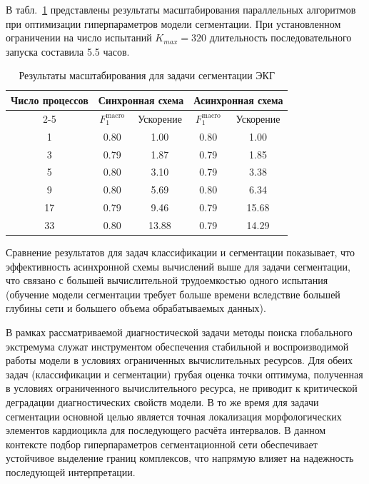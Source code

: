 \documentclass[11pt, oneside, a4paper]{article}
\begin{document}
В табл.~\ref{tab_segmentation_scalability} представлены результаты масштабирования параллельных алгоритмов при оптимизации гиперпараметров модели сегментации. При установленном ограничении на число испытаний $K_{max} = 320$ длительность последовательного запуска составила 5.5 часов.

\begin{table}[ht]
\caption{Результаты масштабирования для задачи сегментации ЭКГ}
\label{tab_segmentation_scalability}
\centering
\begin{tabular}{|c|c|c|c|c|}
\hline
Число процессов & \multicolumn{2}{c|}{Синхронная схема} & \multicolumn{2}{c|}{Асинхронная схема} \\
\cline{2-5}
& $F_1^{\mathrm{macro}}$ & Ускорение & $F_1^{\mathrm{macro}}$ & Ускорение \\
\hline
1  & 0.80  & 1.00   & 0.80  & 1.00  \\
3  & 0.79   & 1.87    & 0.79  & 1.85  \\
5  & 0.80   & 3.10    & 0.79  & 3.38  \\
9  & 0.80  & 5.69   & 0.80  & 6.34  \\
17 & 0.79  & 9.46   & 0.79  & 15.68 \\
33 & 0.80  & 13.88  & 0.79  & 14.29 \\
\hline
\end{tabular}

\end{table}

Сравнение результатов для задач классификации и сегментации показывает, что эффективность асинхронной схемы вычислений выше для задачи сегментации, что связано с большей вычислительной трудоемкостью одного испытания (обучение модели сегментации требует больше времени вследствие большей глубины сети и большего объема обрабатываемых данных).



В рамках рассматриваемой диагностической задачи методы поиска глобального экстремума служат инструментом обеспечения стабильной и воспроизводимой работы модели в условиях ограниченных вычислительных ресурсов.
Для обеих задач (классификации и сегментации) грубая оценка точки оптимума, полученная в условиях ограниченного вычислительного ресурса, не приводит к критической деградации диагностических свойств модели. 
В то же время для задачи сегментации основной целью является точная локализация морфологических элементов кардиоцикла для последующего расчёта интервалов. В данном контексте подбор гиперпараметров сегментационной сети обеспечивает устойчивое выделение границ комплексов, что напрямую влияет на надежность последующей интерпретации.  
\end{document}
